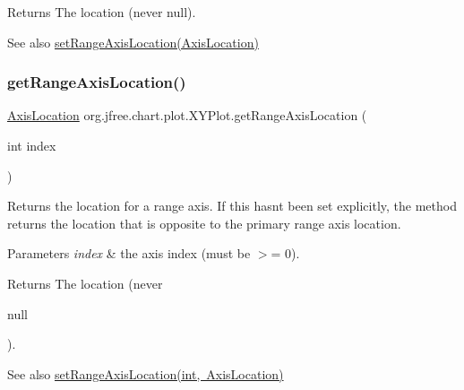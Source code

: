 \begin{DoxyReturn}{Returns}
The location (never {\ttfamily null}).
\end{DoxyReturn}
\begin{DoxySeeAlso}{See also}
\mbox{\hyperlink{classorg_1_1jfree_1_1chart_1_1plot_1_1_x_y_plot_ae3d54bdb3cf80b88fe249e455f894475}{set\+Range\+Axis\+Location(\+Axis\+Location)}} 
\end{DoxySeeAlso}
\mbox{\label{classorg_1_1jfree_1_1chart_1_1plot_1_1_x_y_plot_a8e34e93de05b6fff6f0af0bef7b285d7}} 
\subsubsection{\texorpdfstring{get\+Range\+Axis\+Location()}{getRangeAxisLocation()}\hspace{0.1cm}{\footnotesize\ttfamily [2/2]}}
{\footnotesize\ttfamily \mbox{\hyperlink{classorg_1_1jfree_1_1chart_1_1axis_1_1_axis_location}{Axis\+Location}} org.\+jfree.\+chart.\+plot.\+X\+Y\+Plot.\+get\+Range\+Axis\+Location (\begin{DoxyParamCaption}\item[{int}]{index }\end{DoxyParamCaption})}

Returns the location for a range axis. If this hasn\textquotesingle{}t been set explicitly, the method returns the location that is opposite to the primary range axis location.


\begin{DoxyParams}{Parameters}
{\em index} & the axis index (must be $>$= 0).\\
\hline
\end{DoxyParams}
\begin{DoxyReturn}{Returns}
The location (never
\begin{DoxyCode}
null 
\end{DoxyCode}
 ).
\end{DoxyReturn}
\begin{DoxySeeAlso}{See also}
\mbox{\hyperlink{classorg_1_1jfree_1_1chart_1_1plot_1_1_x_y_plot_a7421dcb0efb6a256b010db43c4260d88}{set\+Range\+Axis\+Location(int, Axis\+Location)}} 
\end{DoxySeeAlso}
\mbox{\label{classorg_1_1jfree_1_1chart_1_1plot_1_1_x_y_plot_ab531ad9c9bd346bb3c90e9416097e898}} 
